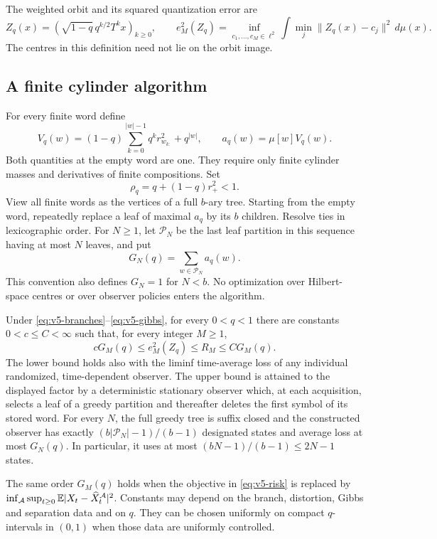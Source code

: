 The weighted orbit and its squared quantization error are
\begin{equation}\label{eq:v5-orbit}
 Z_q(x)=(\sqrt{1-q}\,q^{k/2}T^kx)_{k\ge0},\qquad
 e_M^2(Z_q)=\inf_{c_1,\ldots,c_M\in\ell^2}
      \int\min_j\|Z_q(x)-c_j\|^2\,d\mu(x).
\end{equation}
The centres in this definition need not lie on the orbit image.

\subsection{A finite cylinder algorithm}
For every finite word define
\begin{equation}\label{eq:v5-cost}
 V_q(w)=(1-q)\sum_{k=0}^{|w|-1}q^k r_{w_{k:}}^2+q^{|w|},
 \qquad a_q(w)=\mu[w]V_q(w).
\end{equation}
Both quantities at the empty word are one. They require only finite
cylinder masses and derivatives of finite compositions.
Set
\begin{equation}\label{eq:v5-blockchoice}
 \rho_q=q+(1-q)r_+^2<1.
\end{equation}
View all finite words as the vertices of a full $b$-ary tree.
Starting from the empty word, repeatedly replace a leaf
of maximal $a_q$ by its $b$ children. Resolve ties in lexicographic
order. For $N\ge1$, let $\mathcal P_N$ be the last leaf partition in
this sequence having at most $N$ leaves, and put
\begin{equation}\label{eq:v5-greedy}
 G_N(q)=\sum_{w\in\mathcal P_N}a_q(w).
\end{equation}
This convention also defines $G_N=1$ for $N<b$. No optimization over
Hilbert-space centres or over observer policies enters the algorithm.

\begin{theorem}
\label{thm:v5-intrinsic}
Under \eqref{eq:v5-branches}--\eqref{eq:v5-gibbs}, for every $0<q<1$
there are constants $0<c\le C<\infty$ such that, for every integer
$M\ge1$,
\begin{equation}\label{eq:v5-equivalence}
 cG_M(q)\le e_M^2(Z_q)\le R_M\le CG_M(q).
\end{equation}
The lower bound holds also with the liminf time-average loss of any
individual randomized, time-dependent observer. The upper bound is
attained to the displayed factor by a deterministic stationary
observer which, at each acquisition, selects a leaf of a greedy
partition and thereafter deletes the first symbol of its stored word.
For every $N$, the full greedy tree is suffix closed and the
constructed observer has exactly $(b|\mathcal P_N|-1)/(b-1)$
designated states and average loss at most $G_N(q)$. In particular,
it uses at most $(bN-1)/(b-1)\le2N-1$ states.

The same order $G_M(q)$ holds when the objective in \eqref{eq:v5-risk}
is replaced by $\inf_{\mathcal A}\sup_{t\ge0}
\mathbb E|X_t-\widehat X_t^{\mathcal A}|^2$.
Constants may depend on the branch, distortion, Gibbs and separation
data and on $q$. They can be chosen uniformly on compact
$q$-intervals in $(0,1)$ when those data are uniformly controlled.
\end{theorem}

